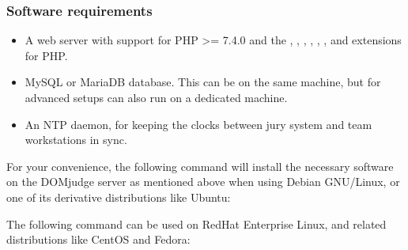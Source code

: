 \documentclass[a4paper,10pt,english,openany]{sphinxmanual}
\begin{document}
\subsubsection{Software requirements}
\label{\detokenize{install-domserver:software-requirements}}\begin{itemize}
\item {} 
\sphinxAtStartPar
A web server with support for PHP \textgreater{}= 7.4.0 and the , , ,
, , ,  and  extensions for PHP.

\item {} 
\sphinxAtStartPar
MySQL or MariaDB database. This can be on the same machine, but for
advanced setups can also run on a dedicated machine.

\item {} 
\sphinxAtStartPar
An NTP daemon, for keeping the clocks between jury system and team
workstations in sync.

\end{itemize}

\sphinxAtStartPar
For your convenience, the following command will install the necessary
software on the DOMjudge server as mentioned above when using Debian
GNU/Linux, or one of its derivative distributions like Ubuntu:

\begin{sphinxVerbatim}[commandchars=\\\{\}]
          \PYGZbs{}
             \PYGZbs{}
           
\end{sphinxVerbatim}

\sphinxAtStartPar
The following command can be used on RedHat Enterprise Linux, and related
distributions like CentOS and Fedora:
\end{document}

